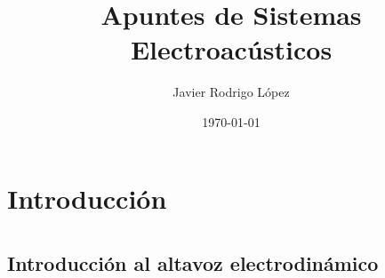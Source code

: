 \documentclass[12pt, a4paper]{article}
\title{Apuntes de Sistemas Electroacústicos}
\author{Javier Rodrigo López}
\date{\today}
\begin{document}
\maketitle

\tableofcontents

\newpage
\section*{Introducción}

\section{}

\subsection{Introducción al altavoz electrodinámico}
\end{document}
